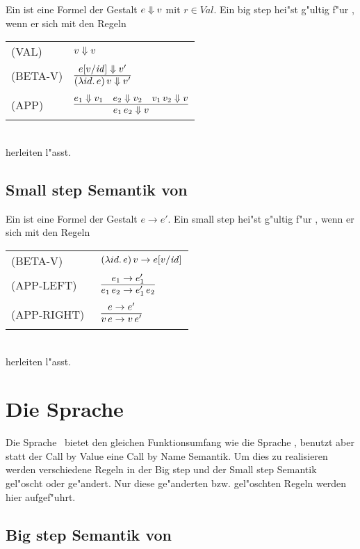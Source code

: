 Ein  ist eine Formel der Gestalt $e \Downarrow v$ mit $r \in Val$. Ein big step hei"st g"ultig f"ur \LZERO, wenn
er sich mit den Regeln\\[5mm]
  \begin{tabular}{ll}
     \mbox{(VAL)}         & $v \Downarrow v$ \\[3mm]
     \mbox{(BETA-V)}      & $\regel{e[v/\id] \eval v'}
                                   {(\abstr{id}{e})\,v \eval v'}$ \\[5mm]
     \mbox{(APP)}         & $\regel{e_1 \eval v_1 \quad e_2 \eval v_2 \quad v_1\,v_2 \eval v}
                                   {e_1\,e_2 \eval v}$
  \end{tabular}\\[7mm]
herleiten l"asst.


\subsection{Small step Semantik von \LZERO}

Ein  ist eine Formel der Gestalt $e \to e'$. Ein small step hei"st g"ultig f"ur \LZERO, wenn er sich mit den
Regeln\\[5mm]
   \begin{tabular}{ll}
     \mbox{(BETA-V)}      & $(\lambda id.\,e)\,v \to e[v/{\text{\it id\/}}]$ \\[5mm]
     \mbox{(APP-LEFT)}    & $\regel{e_1\to e'_1}
                               {e_1\,e_2 \to e'_1\,e_2}$ \\[3mm]
     \mbox{(APP-RIGHT)\ } & $\regel{e \to e'}
                                  {v\,e \to v\,e'}$
\end{tabular}\\[7mm]
herleiten l"asst.



\section{Die Sprache \LZEROCBN}

Die Sprache \LZEROCBN \ bietet den gleichen Funktionsumfang wie die Sprache \LZERO, benutzt aber statt der 
Call by Value eine Call by Name Semantik. Um dies zu realisieren werden verschiedene Regeln in der Big step 
und der Small step Semantik gel"oscht oder ge"andert. Nur diese ge"anderten bzw. gel"oschten Regeln werden hier
aufgef"uhrt.

\subsection{Big step Semantik von \LZEROCBN}

